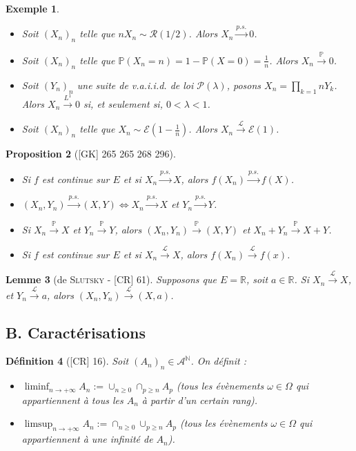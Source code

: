 \documentclass[10pt, a4paper, parskip=full, twoside, twocolumn]{report}
\newtheorem{definition}{Définition}
\newtheorem{proposition}[definition]{Proposition}
\newtheorem{lemma}[definition]{Lemme}
\newtheorem{example}[definition]{Exemple}
\newcommand{\IN}{\mathbb{N}}
\newcommand{\IR}{\mathbb{R}}
\newcommand{\A}{\mathscr{A}}
\begin{document}
\begin{example}
	\begin{itemize}
		\item Soit $\left(X_n\right)_n$ telle que $nX_n\sim \mathcal{R}(1/2)$. Alors $X_n\xrightarrow{p.s.} 0$.
		\item Soit $\left(X_n\right)_n$ telle que $\mathbb{P}(X_n=n) = 1 - \mathbb{P}(X=0) = \frac{1}{n}$. Alors $X_n\xrightarrow{\mathbb{P}} 0$.
		\item Soit $\left(Y_n\right)_n$ une suite de v.a.i.i.d. de loi $\mathcal{P}(\lambda)$, posons $X_n = \prod_{k=1}{n}Y_k$. Alors $X_n \xrightarrow{L^1} 0$ si, et seulement si, $0< \lambda < 1$.
		\item Soit $\left(X_n\right)_n$ telle que $X_n\sim \mathcal{E}(1-\frac{1}{n})$. Alors $X_n\xrightarrow{\mathcal{L}} \mathcal{E}(1)$.
	\end{itemize}
\end{example}

\begin{proposition}[\textnormal{[GK] 265 265 268 296}]
	\begin{itemize}
		\item Si $f$ est continue sur $E$ et si $X_n\xrightarrow{p.s.}X$, alors $f(X_n)\xrightarrow{p.s.} f(X)$.
		\item $(X_n,Y_n)\xrightarrow{p.s.}(X,Y)\iff X_n\xrightarrow{p.s.} X$ et $Y_n\xrightarrow{p.s.}Y$.
		\item Si $X_n\xrightarrow{\mathbb{P}}X$ et $Y_n\xrightarrow{\mathbb{P}}Y$, alors $(X_n, Y_n)\xrightarrow{\mathbb{P}} (X,Y)$ et $X_n + Y_n \xrightarrow{\mathbb{P}} X + Y$.
		\item Si $f$ est continue sur $E$ et si $X_n\xrightarrow{\mathcal{L}}X$, alors $f(X_n)\xrightarrow{\mathcal{L}}f(x)$.
	\end{itemize}
\end{proposition}

\begin{lemma}[de \textsc{Slutsky} - \textnormal{[CR] 61}]
	Supposons que $E = \IR$, soit $a\in \IR$.
	Si $X_n \xrightarrow{\mathcal{L}} X$, et $Y_n\xrightarrow{\mathcal{L}}a$, alors $(X_n, Y_n)\xrightarrow{\mathcal{L}} (X,a)$.
\end{lemma}

\subsection*{B. Caractérisations}
\begin{definition}[\textnormal{[CR] 16}]
	Soit $\left(A_n\right)_n \in \A^{\IN}$. On définit :
	\begin{itemize}
		\item {$\liminf_{n\to+\infty} A_n := \cup_{n\geq 0}\cap_{p\geq n} A_p$ (tous les évènements $\omega\in \Omega$ qui appartiennent à tous les $A_n$ à partir d'un certain rang).}
		\item {$\limsup_{n\to+\infty} A_n := \cap_{n\geq 0}\cup_{p\geq n} A_p$ (tous les évènements $\omega\in \Omega$ qui appartiennent à une infinité de $A_n$).}
	\end{itemize}
\end{definition}
\end{document}
